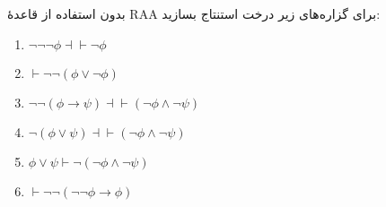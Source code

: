 بدون استفاده از قاعدهٔ {RAA} برای گزاره‌های زیر درخت استنتاج بسازید:
\begin{enumerate}[label=(\alph*)]
    \item $\neg\neg\neg\phi\dashv\vdash\neg\phi$
    \item $\vdash\neg\neg(\phi\vee\neg\phi)$
    \item $\neg\neg(\phi\to\psi)\dashv\vdash(\neg\phi\wedge\neg\psi)$
    \item $\neg(\phi\vee\psi)\dashv\vdash(\neg\phi\wedge\neg\psi)$
    \item $\phi\vee\psi\vdash\neg(\neg\phi\wedge\neg\psi)$
    \item $\vdash\neg\neg(\neg\neg\phi\to\phi)$
\end{enumerate}